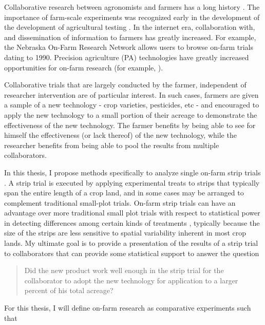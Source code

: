 \documentclass[phdcss]{SDSUThesis}
\begin{document}
Collaborative research between agronomists and farmers has a long history \cite{doerge-07-1999, kyveryga-11-2019, riley-03-2001}. The importance of farm-scale experiments was recognized early in the development of the development of agricultural testing \cite{student-12-1923, student-02-1938}. In the internet era, collaboration with, and dissemination of information to farmers has greatly increased. For example, the Nebraska On-Farm Research Network \cite{agriculture-2024} allows users to browse on-farm trials dating to 1990.  Precision agriculture (PA) technologies have greatly increased opportunities for on-farm research (for example, \cite{lawes.r-03-2012, taylor-08-2011}). 


Collaborative trials that are largely conducted by the farmer, independent of researcher intervention are of particular interest. In such cases, farmers are given a sample of a new technology - crop varieties, pesticides, etc - and encouraged to apply the new technology to a small portion of their acreage to demonstrate the effectiveness of the new technology. The farmer benefits by being able to see for himself the effectiveness (or lack thereof) of the new technology, while the researcher benefits from being able to pool the results from multiple collaborators. 


In this thesis, I propose methods specifically to analyze single on-farm strip trials \cite{network-2023, hicks-1997, kyveryga-06-2018}. A strip trial is executed by applying experimental treats to strips that typically span the entire length of a crop land, and in some cases may be arranged to complement traditional small-plot trials. On-farm strip trials can have an advantage over more traditional small plot trials with respect to statistical power in detecting differences among certain kinds of treatments \cite{kandel-2018, li-09-2022, laurent-2022}, typically because the size of the strips are less sensitive to spatial variability inherent in most crop lands. My ultimate goal is to provide a presentation of the results of a strip trial to collaborators that can provide some statistical support to answer the question 
\begin{quotation}
   Did the new product work well enough in the strip trial for the collaborator to adopt the new technology for application to a larger percent of his total acreage?
\end{quotation}

For this thesis, I will define on-farm research as comparative experiments such that
\end{document}
